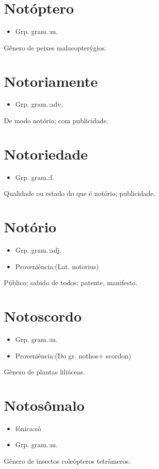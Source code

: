 \section{Notóptero}
\begin{itemize}
\item {Grp. gram.:m.}
\end{itemize}
Gênero de peixes malacopterýgios.
\section{Notoriamente}
\begin{itemize}
\item {Grp. gram.:adv.}
\end{itemize}
De modo notório; com publicidade.
\section{Notoriedade}
\begin{itemize}
\item {Grp. gram.:f.}
\end{itemize}
Qualidade ou estado do que é notório; publicidade.
\section{Notório}
\begin{itemize}
\item {Grp. gram.:adj.}
\end{itemize}
\begin{itemize}
\item {Proveniência:(Lat. \textunderscore notorius\textunderscore )}
\end{itemize}
Público; sabido de todos; patente, manifesto.
\section{Notoscordo}
\begin{itemize}
\item {Grp. gram.:m.}
\end{itemize}
\begin{itemize}
\item {Proveniência:(Do gr. \textunderscore nothos\textunderscore  + \textunderscore scordon\textunderscore )}
\end{itemize}
Gênero de plantas liliáceas.
\section{Notosômalo}
\begin{itemize}
\item {fónica:sô}
\end{itemize}
\begin{itemize}
\item {Grp. gram.:m.}
\end{itemize}
Gênero de insectos coleópteros tetrâmeros.
